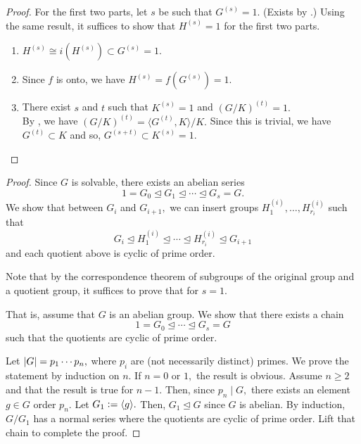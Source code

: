 \twoofthreesolvable*\label{prop:twoofthreesolvable2}
\begin{flushright}\hyperref[prop:twoofthreesolvable]{\upsym}\end{flushright}
\begin{proof}
    For the first two parts, let $s$ be such that $G^{(s)} = 1.$ (Exists by .) Using the same result, it suffices to show that $H^{(s)} = 1$ for the first two parts.
    \begin{enumerate}[leftmargin=*]
        \item $H^{(s)} \cong i(H^{(s)}) \subset G^{(s)} = 1.$
        \item Since $f$ is onto, we have $H^{(s)} = f(G^{(s)}) = 1.$
        \item There exist $s$ and $t$ such that $K^{(s)} = 1$ and $(G/K)^{(t)} = 1.$\\
        By , we have $(G/K)^{(t)} = \langle G^{(t)}, K\rangle/K.$ Since this is trivial, we have $G^{(t)} \subset K$ and so, $G^{(s + t)} \subset K^{(s)} = 1.$ \qedhere
    \end{enumerate}
\end{proof}

\label{prop:refiningabelianseries2}
\begin{flushright}\hyperref[prop:refiningabelianseries]{\upsym}\end{flushright}
\begin{proof}
    Since $G$ is solvable, there exists an abelian series
    \begin{equation*} 
        1 = G_0 \unlhd G_1 \unlhd \cdots \unlhd G_s = G.
    \end{equation*}
    We show that between $G_i$ and $G_{i + 1},$ we can insert groups $H_1^{(i)}, \ldots, H_{r_i}^{(i)}$ such that 
    \begin{equation*} 
        G_i \unlhd H_1^{(i)} \unlhd \cdots \unlhd H_{r_i}^{(i)} \unlhd G_{i + 1}
    \end{equation*}
    and each quotient above is cyclic of prime order.

    Note that by the correspondence theorem of subgroups of the original group and a quotient group, it suffices to prove that for $s = 1.$

    That is, assume that $G$ is an abelian group. We show that there exists a chain
    \begin{equation*} 
        1 = G_0 \unlhd \cdots \unlhd G_s = G
    \end{equation*}
    such that the quotients are cyclic of prime order.

    Let ${\left\lvert G \right\lvert} = p_1 \cdots p_n,$ where $p_i$ are (not necessarily distinct) primes. We prove the statement by induction on $n.$ If $n = 0$ or $1,$ the result is obvious. Assume $n \ge 2$ and that the result is true for $n - 1.$ Then, since $p_n \mid G,$ there exists an element $g \in G$ order $p_n.$ Let $G_1 \vcentcolon= \langle g\rangle.$ Then, $G_1 \unlhd G$ since $G$ is abelian. By induction, $G/G_1$ has a normal series where the quotients are cyclic of prime order. Lift that chain to complete the proof.
\end{proof}

